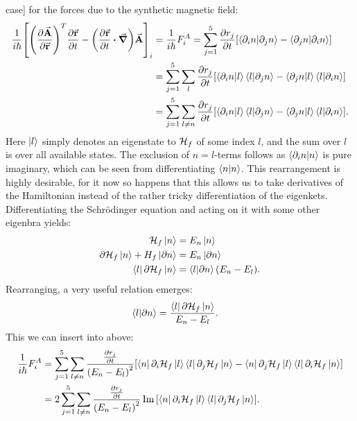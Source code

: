 \documentclass[a4paper]{article}
\begin{document}
case] for the forces due to the synthetic magnetic field:
\begin{align*}
             \frac{1}{i\hbar{}}\bqty{\pqty{\frac{\partial \va{A}}{\partial \va{r}}}^T \frac{\partial
\va{r}}{\partial t} - \pqty{\frac{\partial \va{r}}{\partial t}  \vdot \grad}\va{A}}_i
 &= \frac{1}{i\hbar{}}F_{i}^A = \sum_{j=1}^{5} \frac{\partial
        r_j}{\partial t} \bqty{\bra{\partial_i n}\ket{\partial_j n}-\bra{\partial_j n}\ket{\partial_i
        n}}\\
        &= \sum_{j=1}^{5} \sum_{l} \frac{\partial r_j}{\partial t}\bqty{\bra{\partial_i
                n}\ket{l}\bra{l}\ket{\partial_j n}- \bra{\partial_j
        n}\ket{l}\bra{l}\ket{\partial_i n}}\\
        &= \sum_{j=1}^{5} \sum_{l \ne n} \frac{\partial r_j}{\partial t}\bqty{\bra{\partial_i
                n}\ket{l}\bra{l}\ket{\partial_j n}- \bra{\partial_j
        n}\ket{l}\bra{l}\ket{\partial_i n}}
.\end{align*}
Here \(\ket{l}\) simply denotes an eigenstate to \(\mathbb{\cal H}_{f}\) of some index
\(l\), and the sum over \(l\) is over all available states. The exclusion of \(n=l\)-terms follows as
\(\bra{\partial_i n}\ket{n}\) is pure imaginary, which can be seen from differentiating
\(\bra{n}\ket{n}\). This rearrangement is highly desirable, for it now so happens that this
allows us to take derivatives of the Hamiltonian instead of the rather tricky
differentiation of the eigenkets. Differentiating the Schrödinger equation and acting on it
with some other eigenbra yields:
\begin{align*}
        \mathbb{\cal H}_f \ket{n} &= E_n \ket{n}\\
        \partial \mathbb{\cal H}_f \ket{n} + H_f \ket{\partial n} &= E_n \ket{\partial n}\\
        \bra{l}\partial \mathbb{\cal H}_f \ket{n} &= \bra{l}\ket{\partial n}(E_n - E_l)
.\end{align*}
Rearranging, a very useful relation emerges:
\begin{align}\label{eq:Hdiff}
        \bra{l}\ket{\partial n} &= \frac{\bra{l}\partial \mathbb{\cal H}_f \ket{n}}{E_n
        - E_l}
.\end{align}
This we can insert into above:
\begin{align}\label{eq:FA}
\frac{1}{i\hbar{}}F_i^A &= \sum_{j=1}^{5} \sum_{l \ne n} \frac{\frac{\partial r_j}{\partial
        t}}{\pqty{E_n-E_l}^2}\bqty{\bra{n}\partial_i \mathbb{\cal H}_f
        \ket{l}\bra{l}\partial_j\mathbb{\cal H}_f\ket{n} - \bra{n}\partial_j \mathbb{\cal
        H}_f\ket{l}\bra{l}\partial_i \mathbb{\cal H}_f\ket{n}}\\
        &= 2\sum_{j=1}^{5} \sum_{l \ne n} \frac{\frac{\partial r_j}{\partial
        t}}{\pqty{E_n-E_l}^2} \Im \bqty{\bra{n}\partial_i \mathbb{\cal H}_f
        \ket{l}\bra{l}\partial_j\mathbb{\cal H}_f\ket{n}}
.\end{align}
\end{document}
